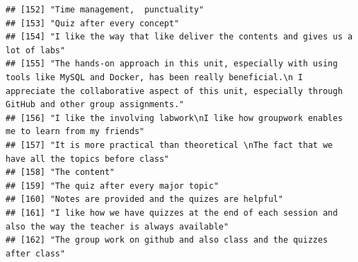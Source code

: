 \documentclass[
]{article}
\begin{document}
\begin{verbatim}
## [152] "Time management,  punctuality"                                                                                                                                                                                                                    
## [153] "Quiz after every concept"                                                                                                                                                                                                                         
## [154] "I like the way that like deliver the contents and gives us a lot of labs"                                                                                                                                                                         
## [155] "The hands-on approach in this unit, especially with using tools like MySQL and Docker, has been really beneficial.\n I appreciate the collaborative aspect of this unit, especially through GitHub and other group assignments."                  
## [156] "I like the involving labwork\nI like how groupwork enables me to learn from my friends"                                                                                                                                                           
## [157] "It is more practical than theoretical \nThe fact that we have all the topics before class"                                                                                                                                                        
## [158] "The content"                                                                                                                                                                                                                                      
## [159] "The quiz after every major topic"                                                                                                                                                                                                                 
## [160] "Notes are provided and the quizes are helpful"                                                                                                                                                                                                    
## [161] "I like how we have quizzes at the end of each session and also the way the teacher is always available"                                                                                                                                           
## [162] "The group work on github and also class and the quizzes after class"                                                                                                                                                                              

\end{verbatim}
\end{document}
